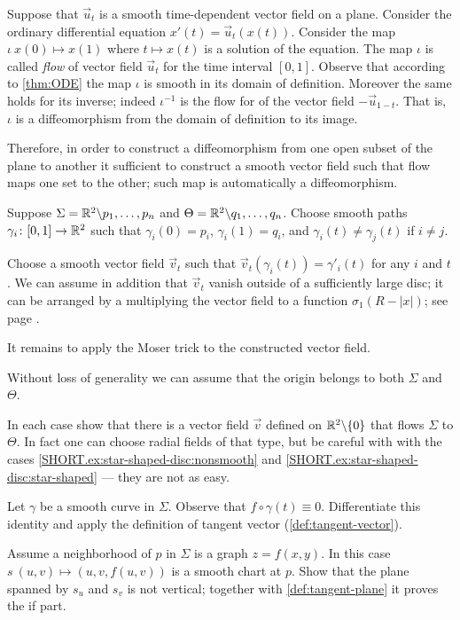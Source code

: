 Suppose that $\vec u_t$ is a smooth time-dependent vector field on a plane.
Consider the ordinary differential equation $x'(t)=\vec u_t(x(t))$.
Consider the map $\iota\:x(0)\mapsto x(1)$ where $t\mapsto x(t)$ is a solution of the equation.
The map $\iota$ is called \emph{flow} of vector field $\vec u_t$ for the time interval $[0,1]$.
Observe that according to \ref{thm:ODE} the map $\iota$ is smooth in its domain of definition.
Moreover the same holds for its inverse;
indeed $\iota^{-1}$ is the flow for of the vector field $-\vec u_{1-t}$.
That is, $\iota$ is a diffeomorphism from the domain of definition to its image. 


Therefore, in order to construct a diffeomorphism from one open subset of the plane to another it sufficient to construct a smooth vector field such that flow maps one set to the other;
such map is automatically a diffeomorphism.


Suppose $\Sigma=\mathbb{R}^2\backslash{p_1,\dots,p_n}$ and $\Theta=\mathbb{R}^2\backslash{q_1,\dots,q_n}$.
Choose smooth paths $\gamma_i\colon[0,1]\to \mathbb{R}^2$ such that $\gamma_i(0)=p_i$,
$\gamma_i(1)=q_i$, and $\gamma_i(t)\ne \gamma_j(t)$ if $i\ne j$.

Choose a smooth vector field $\vec v_t$ such that $\vec v_t(\gamma_i(t))=\gamma'_i(t)$ for any $i$ and $t$.
We can assume in addition that $\vec v_t$ vanish outside of a sufficiently large disc; it can be arranged by a multiplying the vector field to a function 
$\sigma_1(R-|x|)$; see page \pageref{page:sigma-function}.

It remains to apply the Moser trick to the constructed vector field. 

Without loss of generality we can assume that the origin belongs to both $\Sigma$ and $\Theta$.

In each case show that there is a vector field $\vec v$ defined on $\mathbb{R}^2\backslash\{0\}$ that flows $\Sigma$ to $\Theta$.
In fact one can choose radial fields of that type,
but be careful with with the cases \ref{SHORT.ex:star-shaped-disc:nonsmooth} and \ref{SHORT.ex:star-shaped-disc:star-shaped} --- they are not as easy.

Let $\gamma$ be a smooth curve in $\Sigma$.
Observe that $f\circ\gamma(t)\equiv 0$.
Differentiate this identity and apply the definition of tangent vector (\ref{def:tangent-vector}).

Assume a neighborhood of $p$ in $\Sigma$ is a graph $z=f(x,y)$.
In this case $s\:(u,v)\mapsto (u,v,f(u,v))$ is a smooth chart at $p$.
Show that the plane spanned by $s_u$ and $s_v$ is not vertical;
together with \ref{def:tangent-plane} it proves the if part.

